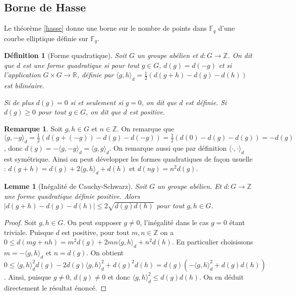 \documentclass{article}
\theoremstyle{plain}%
\newtheorem{deff}[thm]{Définition}
\newtheorem{lem}[thm]{Lemme}
\theoremstyle{definition}%
\newtheorem{rem}[thm]{Remarque}
\newcommand{\F}{\mathbb{F}}
\newcommand{\Z}{\mathbb{Z}}
\begin{document}
\subsection{Borne de Hasse}

Le théorème \ref{hasse} donne une borne sur le nombre de points dans $\F_q$ d'une courbe elliptique définie sur $\F_q$.

\begin{deff}[Forme quadratique]
  Soit $G$ un groupe abélien et $d:G\to \Z$. On dit que $d$ est une forme quadratique si pour tout $g \in G$, $d(g) = d(-g)$ et si l'application $G\times G \to \mathbb R$, définie par  $\langle g, h\rangle_d = \frac{1}{2}(d(g+h) - d(g) -d(h))$ est bilinéaire.

  Si de plus $d(g) = 0$ si et seulement si $g=0$, on dit que $d$ est définie. Si $d(g) \ge 0$ pour tout $g\in G$, on dit que $d$ est positive.
\end{deff}

\begin{rem}
  Soit $g, h\in G$ et $n\in \Z$. On remarque que $\langle g, -g\rangle_d = \frac{1}{2}(d(g + (-g)) - d(g) -d(-g)) =\frac{1}{2}( d(0) - d(g) -d(g)) = -d(g)$, donc $d(g) = -\langle g, -g\rangle_d = \langle g, g\rangle_d$. On remarque aussi que par définition $\langle\cdot,\cdot\rangle_d$ est symétrique. Ainsi on peut développer les formes quadratiques de façon usuelle : $d(g+h) =  d(g) + 2\langle g, h\rangle_d + d(h)$ et $d(ng) = n^2d(g)$.
\end{rem}

\begin{lem}[Inégalité de Cauchy-Schwarz]
  \label{Cauchy-Schwarz}
  Soit $G$ un groupe abélien. Et $d:G\to \mathbb Z$ une forme quadratique définie positive. Alors $|d(g+h) - d(g) -d(h)|\le 2\sqrt{d(g)d(h)}$ pour tout $g, h\in G$.  
\end{lem}

\begin{proof}
    Soit $g, h\in G$. On peut supposer $g\neq 0$, l'inégalité dans le cas $g=0$ étant triviale. Puisque $d$ est positive, pour tout $m, n\in \Z$ on a $0 \le d(mg + nh) = m^2d(g) + 2mn\langle g, h\rangle_d + n^2d(h)$. En particulier choisissons $m = -\langle g, h\rangle_d$ et $n=d(g)$. On obtient $0 \le  \langle g, h\rangle_d^2d(g) -2d(g)\langle g, h\rangle_d^2 + d(g)^2d(h) = d(g)(-\langle g, h\rangle_d^2 + d(g)d(h))$. Ainsi, puisque $g\neq 0$, $d(g)\neq 0$ et donc $\langle g, h\rangle_d^2 \le d(g)d(h)$. On en déduit directement le résultat énoncé.
  \end{proof}
\end{document}
